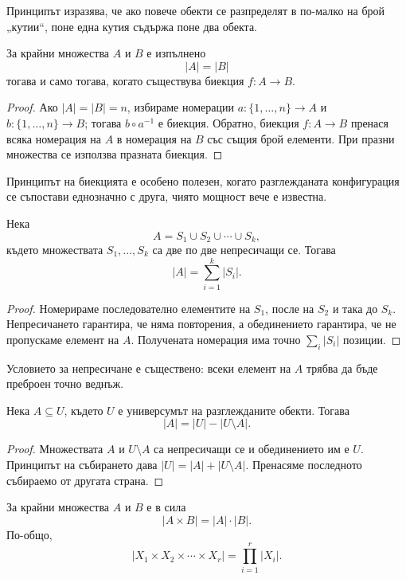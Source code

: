 Принципът изразява, че ако повече обекти се разпределят в по-малко на брой „кутии“, поне една кутия съдържа поне два обекта.

\begin{keythm}
За крайни множества $A$ и $B$ е изпълнено
\[
|A|=|B|
\]
тогава и само тогава, когато съществува биекция $f:A\to B$.
\end{keythm}

\begin{proof}
Ако $|A|=|B|=n$, избираме номерации $a:\{1,\ldots,n\}\to A$ и $b:\{1,\ldots,n\}\to B$; тогава $b\circ a^{-1}$ е биекция. Обратно, биекция $f:A\to B$ пренася всяка номерация на $A$ в номерация на $B$ със същия брой елементи. При празни множества се използва празната биекция.
\end{proof}

Принципът на биекцията е особено полезен, когато разглежданата конфигурация се съпостави еднозначно с друга, чиято мощност вече е известна.

\begin{keythm}
Нека
\[
A=S_1\cup S_2\cup\cdots\cup S_k,
\]
където множествата $S_1,\ldots,S_k$ са две по две непресичащи се. Тогава
\[
|A|=\sum_{i=1}^{k}|S_i|.
\]
\end{keythm}

\begin{proof}
Номерираме последователно елементите на $S_1$, после на $S_2$ и така до $S_k$. Непресичането гарантира, че няма повторения, а обединението гарантира, че не пропускаме елемент на $A$. Получената номерация има точно $\sum_i|S_i|$ позиции.
\end{proof}

Условието за непресичане е съществено: всеки елемент на $A$ трябва да бъде преброен точно веднъж.

\begin{keythm}
Нека $A\subseteq U$, където $U$ е универсумът на разглежданите обекти. Тогава
\[
|A|=|U|-|U\setminus A|.
\]
\end{keythm}

\begin{proof}
Множествата $A$ и $U\setminus A$ са непресичащи се и обединението им е $U$. Принципът на събирането дава $|U|=|A|+|U\setminus A|$. Пренасяме последното събираемо от другата страна.
\end{proof}

\begin{keythm}
За крайни множества $A$ и $B$ е в сила
\[
|A\times B|=|A|\cdot |B|.
\]
По-общо,
\[
|X_1\times X_2\times\cdots\times X_r|
 =\prod_{i=1}^{r}|X_i|.
\]
\end{keythm}

